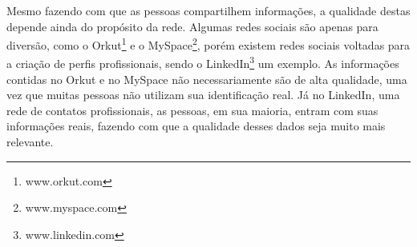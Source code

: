 Mesmo fazendo com que as pessoas compartilhem informações, a qualidade destas depende ainda do propósito da rede. Algumas redes sociais são apenas para diversão, como o Orkut\footnote{www.orkut.com} e o MySpace\footnote{www.myspace.com}, porém existem redes sociais voltadas para a criação de perfis profissionais, sendo o LinkedIn\footnote{www.linkedin.com} um exemplo. As informações contidas no Orkut e no MySpace não necessariamente são de alta qualidade, uma vez que muitas pessoas não utilizam sua identificação real. Já no LinkedIn, uma rede de contatos profissionais, as pessoas, em sua maioria, entram com suas informações reais, fazendo com que a qualidade desses dados seja muito mais relevante.





